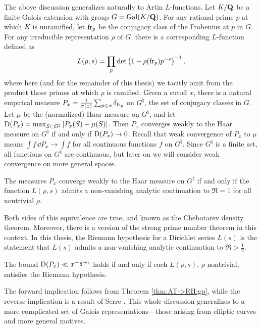 The above discussion generalizes naturally to Artin $L$-functions. 
Let $K/\mathbf{Q}$ be a finite Galois extension with group $G=\operatorname{Gal}(K/\mathbf{Q})$. For any 
rational prime $p$ at which $K$ is unramified, let $\mathrm{fr}_p$ be the conjugacy 
class of the Frobenius at $p$ in $G$. For any irreducible representation 
$\rho$ of $G$, there is a corresponding $L$-function defined as 
\[
	L(\rho,s) = \prod_p \det\left(1-\rho(\mathrm{fr}_p) p^{-s}\right)^{-1} ,
\]
where here (and for the remainder of this thesis) we tacitly omit from the 
product those primes at which $\rho$ is ramified. Given a cutoff $x$, there is 
a natural empirical measure 
$P_x = \frac{1}{\pi(x)} \sum_{p\leqslant x} \delta_{\mathrm{fr}_p}$ on 
$G^\natural$, the set of conjugacy classes in $G$. Let $\mu$ be the 
(normalized) Haar measure on $G^\natural$, and let 
$\operatorname{D}(P_x) = \max_{S\subset G^\natural} \left| P_x(S) - \mu(S)\right|$. 
Then $P_x$ converges weakly to the Haar measure on $G^\natural$ if and 
only if $\operatorname{D}(P_x) \to 0$. Recall that weak convergence of $P_x$ to $\mu$ means 
$\int f\, \dd P_x \to \int f$ for all continuous functions $f$ on $G^\natural$. 
Since $G^\natural$ is a finite set, all functions on $G^\natural$ are 
continuous, but later on we will consider weak convergence on more general 
spaces.  

\begin{theorem}
The measures $P_x$ converge weakly to the Haar measure on $G^\natural$ if and 
only if the function $L(\rho,s)$ admits a non-vanishing analytic continuation 
to $\Re = 1$ for all nontrivial $\rho$. 
\end{theorem}

Both sides of this equivalence are true, and known as the Chebotarev density 
theorem. Moreover, there is a version of the strong prime number theorem in 
this context. In this thesis, the Riemann hypothesis for a Dirichlet series 
$L(s)$ is the statement that $L(s)$ admits a non-vanishing analytic 
continuation to $\Re > \frac 1 2$. 

\begin{theorem}
The bound $\operatorname{D}(P_x) \ll x^{-\frac 1 2+\epsilon}$ holds if and only if each
$L(\rho,s)$, $\rho$ nontrivial, satisfies the Riemann hypothesis. 
\end{theorem}

The forward implication follows from Theorem \ref{thm:AT->RH:gp}, while the reverse implication is a result of Serre \cite[Th.~4]{serre-1981}. 
This whole discussion generalizes to a more complicated set of Galois 
representations---those arising from elliptic curves and more general motives.  





